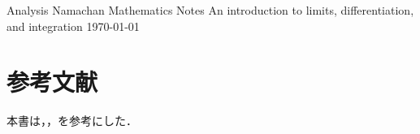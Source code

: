 \documentclass{mathnote}
\begin{document}
\tituloum
  {Analysis}
  {Namachan}
  {Mathematics Notes}
  {An introduction to limits, differentiation, and integration}
  {\today}

%

\cleardoublepage
{}
\pagecolor{white}

\localtableofcontents

\newpage  



\newpage
{}

\part*{参考文献}

\noindent
本書は\cite{sugiura}，\cite{matsuzaka}，\cite{saito}を参考にした．

\medskip

\printbibliography[heading=none]
\clearpage
\thispagestyle{empty}
\setcounter{section}{6}
\renewcommand{\indexname}{索引}

\begingroup
  \let\section\part
  \pagestyle{empty}
  \printindex
\endgroup



\end{document}
